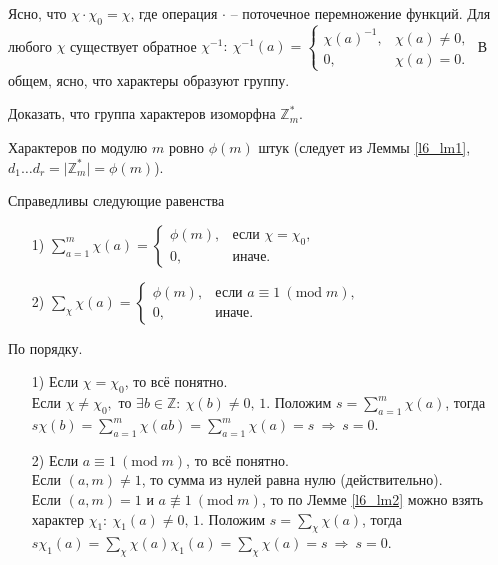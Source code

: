 Ясно, что $\chi \cdot \chi_0 = \chi$, где операция $\cdot$ -- поточечное перемножение функций. Для любого $\chi$ существует обратное $\chi^{-1}: \ \chi^{-1}(a) = \begin{cases}
	\chi(a)^{-1}, & \chi(a) \ne 0, \\
	0, & \chi(a) = 0.
\end{cases}$ В общем, ясно, что характеры образуют группу.

\begin{problem} \label{l6_task}
	Доказать, что группа характеров изоморфна $\mathbb{Z}_m^\ast$.
\end{problem}

Характеров по модулю $m$ ровно $\phi(m)$ штук (следует из Леммы \ref{l6_lm1}, $d_1 \dots d_r = \lvert \mathbb{Z}_m^\ast \rvert = \phi(m)$).

\begin{lemma} \label{l6_lm3}
	Справедливы следующие равенства
	\begin{enumerate}[nolistsep]
		\item[1)] $\displaystyle \sum\limits_{a=1}^m \chi(a) =
			\begin{cases}
				\phi(m), & \text{если } \chi=\chi_0, \\
				0, & \text{иначе.}
			\end{cases}$
		\item[2)] $\displaystyle \sum\limits_\chi \chi(a) =
		\begin{cases}
			\phi(m), & \text{если } a \equiv 1 \ (\mathrm{mod} \; m), \\
			0, & \text{иначе.}
		\end{cases}$
	\end{enumerate}
\end{lemma}
\begin{pf}
	По порядку.
	\begin{enumerate}[nolistsep]
		\item[1)] Если $\chi = \chi_0$, то всё понятно.\\
			Если $\chi \ne \chi_0,$ то $\exists b \in \mathbb{Z}: \ \chi(b) \ne 0, \, 1$. Положим $\displaystyle s = \sum\limits_{a=1}^m \chi(a)$, тогда $\displaystyle s \chi(b) = \sum\limits_{a=1}^m \chi(ab) = \sum\limits_{a=1}^m \chi(a) = s \ \Rightarrow \ s = 0$.
		\item[2)] Если $a \equiv 1 \ (\mathrm{mod} \; m)$, то всё понятно.\\
			Если $(a,m) \ne 1$, то сумма из нулей равна нулю (действительно).\\
			Если $(a,m) = 1$ и $a \not\equiv 1 \ (\mathrm{mod} \; m)$, то по Лемме \ref{l6_lm2} можно взять характер $\chi_1: \ \chi_1(a) \ne 0, \, 1.$
			Положим $\displaystyle s = \sum\limits_\chi \chi(a)$, тогда $\displaystyle s \chi_1(a) = \sum\limits_\chi \chi(a)\chi_1(a) = \sum\limits_\chi \chi(a) = s \ \Rightarrow \ s = 0$.
	\end{enumerate}
\end{pf}

